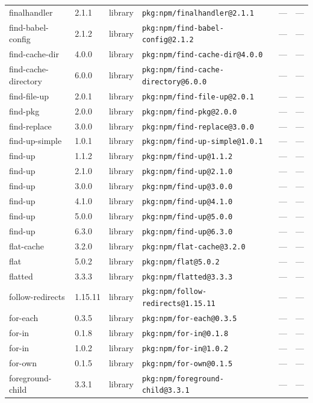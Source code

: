 \documentclass[11pt]{article}
\begin{document}
\begin{longtable}{|l|l|l|p{2.2cm}|l|p{4cm}|}
finalhandler & 2.1.1 & library & \texttt{pkg:npm/finalhandler@2.1.1} & — & — \\
find-babel-config & 2.1.2 & library & \texttt{pkg:npm/find-babel-config@2.1.2} & — & — \\
find-cache-dir & 4.0.0 & library & \texttt{pkg:npm/find-cache-dir@4.0.0} & — & — \\
find-cache-directory & 6.0.0 & library & \texttt{pkg:npm/find-cache-directory@6.0.0} & — & — \\
find-file-up & 2.0.1 & library & \texttt{pkg:npm/find-file-up@2.0.1} & — & — \\
find-pkg & 2.0.0 & library & \texttt{pkg:npm/find-pkg@2.0.0} & — & — \\
find-replace & 3.0.0 & library & \texttt{pkg:npm/find-replace@3.0.0} & — & — \\
find-up-simple & 1.0.1 & library & \texttt{pkg:npm/find-up-simple@1.0.1} & — & — \\
find-up & 1.1.2 & library & \texttt{pkg:npm/find-up@1.1.2} & — & — \\
find-up & 2.1.0 & library & \texttt{pkg:npm/find-up@2.1.0} & — & — \\
find-up & 3.0.0 & library & \texttt{pkg:npm/find-up@3.0.0} & — & — \\
find-up & 4.1.0 & library & \texttt{pkg:npm/find-up@4.1.0} & — & — \\
find-up & 5.0.0 & library & \texttt{pkg:npm/find-up@5.0.0} & — & — \\
find-up & 6.3.0 & library & \texttt{pkg:npm/find-up@6.3.0} & — & — \\
flat-cache & 3.2.0 & library & \texttt{pkg:npm/flat-cache@3.2.0} & — & — \\
flat & 5.0.2 & library & \texttt{pkg:npm/flat@5.0.2} & — & — \\
flatted & 3.3.3 & library & \texttt{pkg:npm/flatted@3.3.3} & — & — \\
follow-redirects & 1.15.11 & library & \texttt{pkg:npm/follow-redirects@1.15.11} & — & — \\
for-each & 0.3.5 & library & \texttt{pkg:npm/for-each@0.3.5} & — & — \\
for-in & 0.1.8 & library & \texttt{pkg:npm/for-in@0.1.8} & — & — \\
for-in & 1.0.2 & library & \texttt{pkg:npm/for-in@1.0.2} & — & — \\
for-own & 0.1.5 & library & \texttt{pkg:npm/for-own@0.1.5} & — & — \\
foreground-child & 3.3.1 & library & \texttt{pkg:npm/foreground-child@3.3.1} & — & — \\

\end{longtable}
\end{document}
